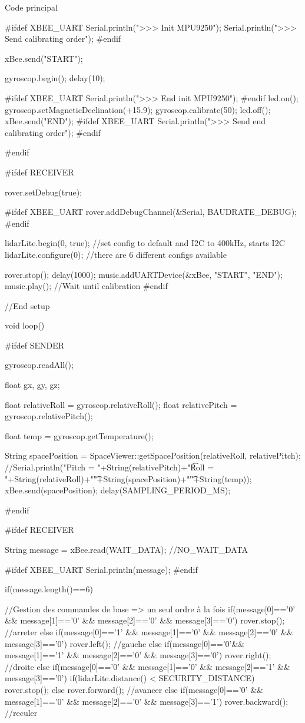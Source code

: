 \begin{Cpp}{Code principal}
{#ifdef XBEE_UART
  Serial.println(">>> Init MPU9250");
  Serial.println(">>> Send calibrating order");
#endif

  xBee.send("START");

  gyroscop.begin();  
  delay(10);

#ifdef XBEE_UART  
  Serial.println(">>> End init MPU9250");
#endif
  led.on();  
  gyroscop.setMagneticDeclination(+15.9);
  gyroscop.calibrate(50);
  led.off();
  xBee.send("END");
#ifdef XBEE_UART
  Serial.println(">>> Send end calibrating order");
#endif
  
  
#endif


#ifdef RECEIVER

  rover.setDebug(true);

#ifdef XBEE_UART
  rover.addDebugChannel(&Serial, BAUDRATE_DEBUG);
#endif

  lidarLite.begin(0, true);   //set config to default and I2C to 400kHz, starts I2C
  lidarLite.configure(0);     //there are 6 different configs available
  
  rover.stop();
  delay(1000);
  music.addUARTDevice(&xBee, "START", "END");
  music.play();   //Wait until calibration
#endif

}//End setup

void loop() {

#ifdef SENDER

  gyroscop.readAll();

  float gx, gy, gz;

  float relativeRoll = gyroscop.relativeRoll();
  float relativePitch = gyroscop.relativePitch();

  float temp = gyroscop.getTemperature();
  
  String spacePosition = SpaceViewer::getSpacePosition(relativeRoll, relativePitch);
  //Serial.println("Pitch = "+String(relativePitch)+"\t Roll = "+String(relativeRoll)+"\t"+String(spacePosition)+"\t"+String(temp));
  xBee.send(spacePosition);
  delay(SAMPLING_PERIOD_MS);

#endif

#ifdef RECEIVER
  
	String message = xBee.read(WAIT_DATA);  //NO_WAIT_DATA

  
#ifdef XBEE_UART
	Serial.println(message);
#endif

  if(message.length()==6) 
  {
    //Gestion des commandes de base => un seul ordre à la fois    
    if(message[0]=='0' && message[1]=='0' && message[2]=='0' && message[3]=='0')
    {
      rover.stop(); //arreter
    }
    else if(message[0]=='1' && message[1]=='0' && message[2]=='0' && message[3]=='0')
    {
      rover.left(); //gauche
    }
    else if(message[0]=='0'&& message[1]=='1' && message[2]=='0' && message[3]=='0')
    {
      rover.right(); //droite
    }
    else if(message[0]=='0' && message[1]=='0' && message[2]=='1' && message[3]=='0')
    {
      if(lidarLite.distance() < SECURITY_DISTANCE)
      {
        rover.stop();
      }
      else
      {
        rover.forward(); //avancer
      }       
    }
    else if(message[0]=='0' && message[1]=='0' && message[2]=='0' && message[3]=='1')
    {
       rover.backward(); //reculer
    }

}}
\end{Cpp}
